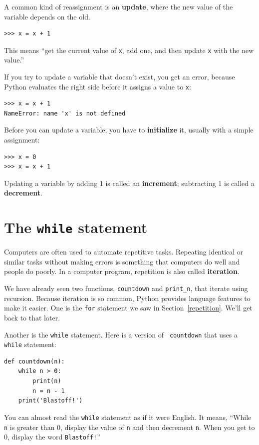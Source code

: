 \documentclass[10pt]{book}
\begin{document}

A common kind of reassignment is an {\bf update},
where the new value of the variable depends on the old.

\begin{verbatim}
>>> x = x + 1
\end{verbatim}
%
This means ``get the current value of {\tt x}, add one, and then
update {\tt x} with the new value.''

If you try to update a variable that doesn't exist, you get an
error, because Python evaluates the right side before it assigns
a value to {\tt x}:

\begin{verbatim}
>>> x = x + 1
NameError: name 'x' is not defined
\end{verbatim}
%
Before you can update a variable, you have to {\bf initialize}
it, usually with a simple assignment:

\begin{verbatim}
>>> x = 0
>>> x = x + 1
\end{verbatim}
%
Updating a variable by adding 1 is called an {\bf increment};
subtracting 1 is called a {\bf decrement}.




\section{The {\tt while} statement}

Computers are often used to automate repetitive tasks.  Repeating
identical or similar tasks without making errors is something that
computers do well and people do poorly.  In a computer program,
repetition is also called {\bf iteration}.

We have already seen two functions, {\tt countdown} and
\verb"print_n", that iterate using recursion.  Because iteration is so
common, Python provides language features to make it easier.
One is the {\tt for} statement we saw in Section~\ref{repetition}.
We'll get back to that later.

Another is the {\tt while} statement.  Here is a version of {\tt
countdown} that uses a {\tt while} statement:

\begin{verbatim}
def countdown(n):
    while n > 0:
        print(n)
        n = n - 1
    print('Blastoff!')
\end{verbatim}
%
You can almost read the {\tt while} statement as if it were English.
It means, ``While {\tt n} is greater than 0,
display the value of {\tt n} and then decrement
{\tt n}.  When you get to 0, display the word {\tt Blastoff!}''
\end{document}
